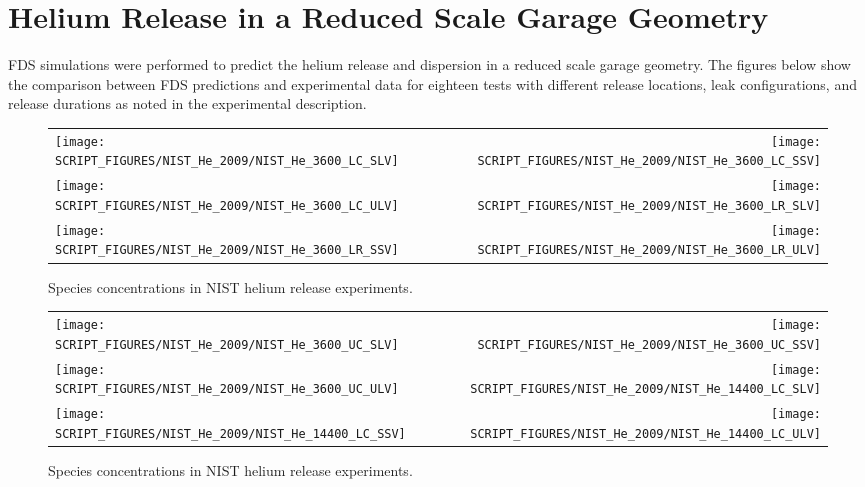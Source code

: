 \clearpage

\section{Helium Release in a Reduced Scale Garage Geometry}
\label{Species Concentration}

FDS simulations were performed to predict the helium release and dispersion in a reduced scale garage geometry.
The figures below show the comparison between FDS predictions and experimental data for eighteen tests with different release locations,
leak configurations, and release durations as noted in the experimental description.

\begin{figure}[h]
\begin{tabular*}{\textwidth}{l@{\extracolsep{\fill}}r}
\texttt{[image: SCRIPT\_FIGURES/NIST\_He\_2009/NIST\_He\_3600\_LC\_SLV]} &
\texttt{[image: SCRIPT\_FIGURES/NIST\_He\_2009/NIST\_He\_3600\_LC\_SSV]} \\
\texttt{[image: SCRIPT\_FIGURES/NIST\_He\_2009/NIST\_He\_3600\_LC\_ULV]} &
\texttt{[image: SCRIPT\_FIGURES/NIST\_He\_2009/NIST\_He\_3600\_LR\_SLV]} \\
\texttt{[image: SCRIPT\_FIGURES/NIST\_He\_2009/NIST\_He\_3600\_LR\_SSV]} &
\texttt{[image: SCRIPT\_FIGURES/NIST\_He\_2009/NIST\_He\_3600\_LR\_ULV]}
\end{tabular*}
\caption[Species concentrations in NIST helium release experiments]{Species concentrations in NIST helium release experiments.}
\label{NIST_Hydrogen_Species_1}
\end{figure}

\begin{figure}[p]
\begin{tabular*}{\textwidth}{l@{\extracolsep{\fill}}r}
\texttt{[image: SCRIPT\_FIGURES/NIST\_He\_2009/NIST\_He\_3600\_UC\_SLV]} &
\texttt{[image: SCRIPT\_FIGURES/NIST\_He\_2009/NIST\_He\_3600\_UC\_SSV]} \\
\texttt{[image: SCRIPT\_FIGURES/NIST\_He\_2009/NIST\_He\_3600\_UC\_ULV]} &
\texttt{[image: SCRIPT\_FIGURES/NIST\_He\_2009/NIST\_He\_14400\_LC\_SLV]} \\
\texttt{[image: SCRIPT\_FIGURES/NIST\_He\_2009/NIST\_He\_14400\_LC\_SSV]} &
\texttt{[image: SCRIPT\_FIGURES/NIST\_He\_2009/NIST\_He\_14400\_LC\_ULV]}
\end{tabular*}
\caption[Species concentrations in NIST helium release experiments]{Species concentrations in NIST helium release experiments.}
\label{NIST_Hydrogen_Species_2}
\end{figure}


